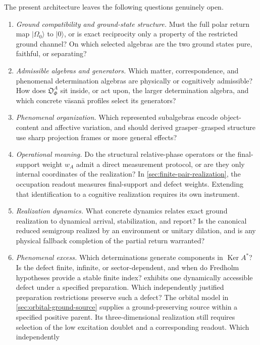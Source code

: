 \documentclass[11pt,reqno]{scrartcl}
\newcommand{\ket}[1]{\lvert #1\rangle}
\DeclareMathOperator{\Ker}{Ker}
\newcommand{\obsF}{\mathfrak O_{\Phi}^{A}}
\newcommand{\presentWeight}{w_{A}}
\theoremstyle{plain}
\theoremstyle{definition}
\theoremstyle{remark}
\begin{document}
The present architecture leaves the following questions genuinely open.
\begin{enumerate}[label=(\roman*)]
  \item \emph{Ground compatibility and ground-state structure.}  Must the full
  polar return map $\ket{\Omega_0}$ to $\ket0$, or is exact reciprocity only a
  property of the restricted ground channel?  On which selected algebras are
  the two ground states pure, faithful, or separating?
  \item \emph{Admissible algebras and generators.}  Which matter,
  correspondence, and phenomenal determination algebras are physically or
  cognitively admissible?  How does $\obsF$ sit inside, or act upon, the larger
  determination algebra, and which concrete v\=asan\=a profiles select its
  generators?
  \item \emph{Phenomenal organization.}  Which represented subalgebras encode
  object-content and affective variation, and should derived
  grasper--grasped structure use sharp projection frames or more general
  effects?
  \item \emph{Operational meaning.}  Do the structural relative-phase
  operators or the final-support weight $\presentWeight$ admit a direct
  measurement protocol, or are they only internal coordinates of the
  realization?  In \cref{sec:finite-pair-realization}, the occupation
  readout measures final-support and defect weights.  Extending that
  identification to a cognitive realization requires its own instrument.
  \item \emph{Realization dynamics.}  What concrete dynamics relates exact
  ground realization to dynamical arrival, stabilization, and report?  Is the
  canonical reduced semigroup realized by an environment or unitary dilation,
  and is any physical fallback completion of the partial return warranted?
  \item \emph{Phenomenal excess.}  Which determinations generate components in
  $\Ker A^*$?  Is the defect finite, infinite, or sector-dependent, and when do
  Fredholm hypotheses provide a stable finite index?
   exhibits one dynamically accessible
  defect under a specified preparation.  Which independently justified
  preparation restrictions preserve such a defect?
  The orbital model in \cref{sec:orbital-ground-source} supplies a
  ground-preserving source within a specified positive parent.  Its
  three-dimensional realization still requires selection of the low
  excitation doublet and a corresponding readout.  Which independently

\end{enumerate}
\end{document}
